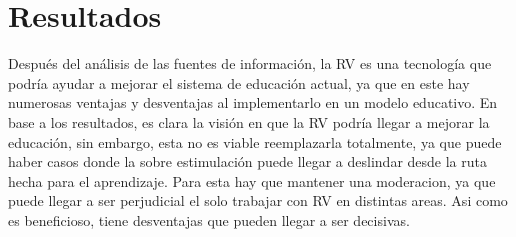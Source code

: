 \section{Resultados}

Después del análisis de las fuentes de información, la RV es una tecnología que podría ayudar a mejorar el sistema de educación actual, ya que en este hay numerosas ventajas y desventajas al implementarlo en un modelo educativo.
En base a los resultados, es clara la visión en que la RV podría llegar a mejorar la educación, sin embargo, esta no es viable reemplazarla totalmente, ya que puede haber casos donde la sobre estimulación puede llegar a deslindar desde la ruta hecha para el aprendizaje. Para esta hay que mantener una moderacion, ya que puede llegar a ser perjudicial el solo trabajar con RV en distintas areas. Asi como es beneficioso, tiene desventajas que pueden llegar a ser decisivas.


